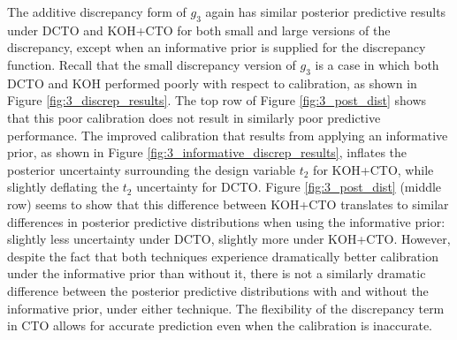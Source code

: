 \documentclass[12pt]{article}
\begin{document}
The additive discrepancy form of $g_3$ again has similar posterior predictive results under DCTO and KOH+CTO for both small and large versions of the discrepancy, except when an informative prior is supplied for the discrepancy function.
%
Recall that the small discrepancy version of $g_3$ is a case in which both DCTO and KOH performed poorly with respect to calibration, as shown in Figure \ref{fig:3_discrep_results}.
%
The top row of Figure \ref{fig:3_post_dist} shows that this poor calibration does not result in similarly poor predictive performance.
%
The improved calibration that results from applying an informative prior, as shown in Figure \ref{fig:3_informative_discrep_results}, inflates the posterior uncertainty surrounding the design variable $t_2$ for KOH+CTO, while slightly deflating the $t_2$ uncertainty for DCTO.
%
Figure \ref{fig:3_post_dist} (middle row) seems to show that this difference between KOH+CTO translates to similar differences in posterior predictive distributions when using the informative prior: slightly less uncertainty under DCTO, slightly more under KOH+CTO.
%
However, despite the fact that both techniques experience dramatically better calibration under the informative prior than without it, there is not a similarly dramatic difference between the posterior predictive distributions with and without the informative prior, under either technique.
%
The flexibility of the discrepancy term in CTO allows for accurate prediction even when the calibration is inaccurate.
%
\end{document}
